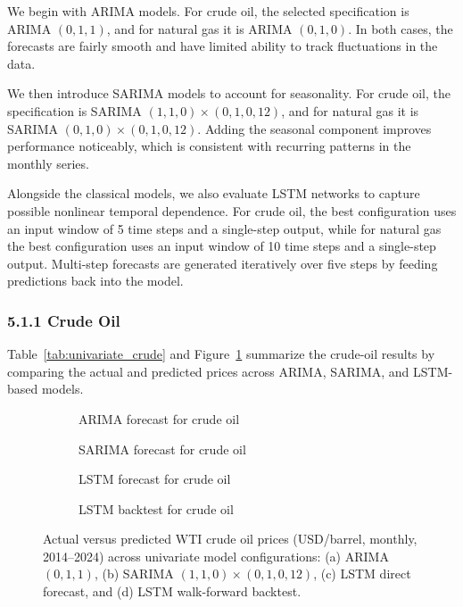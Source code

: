 \documentclass[pdflatex,sn-mathphys-num]{sn-jnl}%
\theoremstyle{thmstyleone}%
\theoremstyle{thmstyletwo}%
\theoremstyle{thmstylethree}%
\begin{document}
We begin with ARIMA models. For crude oil, the selected specification is ARIMA $(0,1,1)$, and for natural gas it is ARIMA $(0,1,0)$. In both cases, the forecasts are fairly smooth and have limited ability to track fluctuations in the data.

We then introduce SARIMA models to account for seasonality. For crude oil, the specification is SARIMA $(1,1,0) \times (0,1,0,12)$, and for natural gas it is SARIMA $(0,1,0) \times (0,1,0,12)$. Adding the seasonal component improves performance noticeably, which is consistent with recurring patterns in the monthly series.

Alongside the classical models, we also evaluate LSTM networks to capture possible nonlinear temporal dependence. For crude oil, the best configuration uses an input window of 5 time steps and a single-step output, while for natural gas the best configuration uses an input window of 10 time steps and a single-step output. Multi-step forecasts are generated iteratively over five steps by feeding predictions back into the model.

\subsubsection*{5.1.1 Crude Oil}\label{subsubsec:oilresults}

Table~\ref{tab:univariate_crude} and Figure~\ref{fig:univariate_crude_plots} summarize the crude-oil results by comparing the actual and predicted prices across ARIMA, SARIMA, and LSTM-based models.

\begin{figure}[h]
\centering
\begin{subfigure}[t]{0.48\textwidth}
\centering

\caption{ARIMA forecast for crude oil}
\end{subfigure}\hfill
\begin{subfigure}[t]{0.48\textwidth}
\centering

\caption{SARIMA forecast for crude oil}
\end{subfigure}

\vspace{1.5em}

\begin{subfigure}[t]{0.48\textwidth}
\centering

\caption{LSTM forecast for crude oil}
\end{subfigure}\hfill
\begin{subfigure}[t]{0.48\textwidth}
\centering

\caption{LSTM backtest for crude oil}
\end{subfigure}
\caption{Actual versus predicted WTI crude oil prices (USD/barrel, monthly, 2014--2024) across univariate model configurations: (a) ARIMA $(0,1,1)$, (b) SARIMA $(1,1,0) \times (0,1,0,12)$, (c) LSTM direct forecast, and (d) LSTM walk-forward backtest.}
\label{fig:univariate_crude_plots}
\end{figure}
\end{document}
